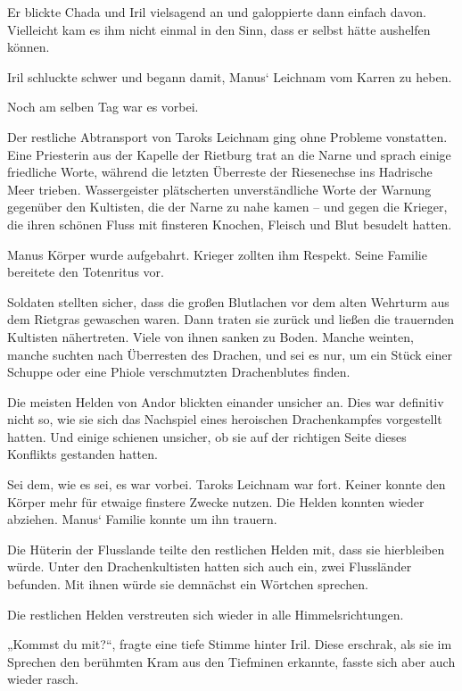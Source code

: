 Er blickte Chada und Iril vielsagend an und galoppierte dann einfach davon. Vielleicht kam es ihm nicht einmal in den Sinn, dass er selbst hätte aushelfen können.

Iril schluckte schwer und begann damit, Manus‘ Leichnam vom Karren zu heben.



\trennzeichen



Noch am selben Tag war es vorbei.

Der restliche Abtransport von Taroks Leichnam ging ohne Probleme vonstatten. Eine Priesterin aus der Kapelle der Rietburg trat an die Narne und sprach einige friedliche Worte, während die letzten Überreste der Riesenechse ins Hadrische Meer trieben. Wassergeister plätscherten unverständliche Worte der Warnung gegenüber den Kultisten, die der Narne zu nahe kamen – und gegen die Krieger, die ihren schönen Fluss mit finsteren Knochen, Fleisch und Blut besudelt hatten.

Manus Körper wurde aufgebahrt. Krieger zollten ihm Respekt. Seine Familie bereitete den Totenritus vor.

Soldaten stellten sicher, dass die großen Blutlachen vor dem alten Wehrturm aus dem Rietgras gewaschen waren. Dann traten sie zurück und ließen die trauernden Kultisten nähertreten. Viele von ihnen sanken zu Boden. Manche weinten, manche suchten nach Überresten des Drachen, und sei es nur, um ein Stück einer Schuppe oder eine Phiole verschmutzten Drachenblutes finden.

Die meisten Helden von Andor blickten einander unsicher an. Dies war definitiv nicht so, wie sie sich das Nachspiel eines heroischen Drachenkampfes vorgestellt hatten. Und einige schienen unsicher, ob sie auf der richtigen Seite dieses Konflikts gestanden hatten.

Sei dem, wie es sei, es war vorbei. Taroks Leichnam war fort. Keiner konnte den Körper mehr für etwaige finstere Zwecke nutzen. Die Helden konnten wieder abziehen. Manus‘ Familie konnte um ihn trauern.

Die Hüterin der Flusslande teilte den restlichen Helden mit, dass sie hierbleiben würde. Unter den Drachenkultisten hatten sich auch ein, zwei Flussländer befunden. Mit ihnen würde sie demnächst ein Wörtchen sprechen.

Die restlichen Helden verstreuten sich wieder in alle Himmelsrichtungen.

„Kommst du mit?“, fragte eine tiefe Stimme hinter Iril. Diese erschrak, als sie im Sprechen den berühmten Kram aus den Tiefminen erkannte, fasste sich aber auch wieder rasch.

